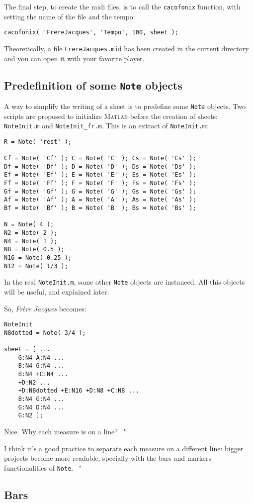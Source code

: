 \documentclass{article}
\newcommand\matlab{\textsc{Matlab}\xspace}
\newcommand\note{\lstinline!Note!\xspace}
\newcommand\frerejaques{\emph{Fr\`ere Jacques}\xspace}
\newcommand\noteInitFile{\texttt{NoteInit.m}\xspace}
\newcommand\noteInitFrFile{\texttt{NoteInit\_fr.m}\xspace}
\newenvironment{meenv}{ \par \noindent \makebox[6em][r]{ \textcolor{mecolor}{Me}: " --~}}{~"}
\newenvironment{myselfenv}{ \par \noindent \makebox[6em][r]{ \textcolor{myselfcolor}{Myself}: " --~}}{~"}
\newcommand{ \me }[1]{%
\begin{meenv}%
	#1%
\end{meenv} }
\newcommand{ \myself }[1]{%
\begin{myselfenv}%
	#1%
\end{myselfenv} }
\begin{document}
The final step, to create the midi files, is to call the \lstinline!cacofonix! function, with setting the name of the file and the tempo:
\begin{lstlisting}
cacofonix( 'FrereJacques', 'Tempo', 100, sheet );
\end{lstlisting}

Theoretically, a file \texttt{FrereJacques.mid} has been created in the current directory and you can open it with your favorite player.

\subsection{Predefinition of some \note objects}

A way to simplify the writing of a sheet is to predefine some \note objects. Two scripts are proposed to initialize \matlab before the creation of sheets: \noteInitFile and \noteInitFrFile. This is an extract of \noteInitFile:
\begin{lstlisting}
R = Note( 'rest' );

Cf = Note( 'Cf' ); C = Note( 'C' ); Cs = Note( 'Cs' );
Df = Note( 'Df' ); D = Note( 'D' ); Ds = Note( 'Ds' );
Ef = Note( 'Ef' ); E = Note( 'E' ); Es = Note( 'Es' );
Ff = Note( 'Ff' ); F = Note( 'F' ); Fs = Note( 'Fs' );
Gf = Note( 'Gf' ); G = Note( 'G' ); Gs = Note( 'Gs' );
Af = Note( 'Af' ); A = Note( 'A' ); As = Note( 'As' );
Bf = Note( 'Bf' ); B = Note( 'B' ); Bs = Note( 'Bs' );

N = Note( 4 );
N2 = Note( 2 );
N4 = Note( 1 );
N8 = Note( 0.5 );
N16 = Note( 0.25 );
N12 = Note( 1/3 );
\end{lstlisting}

In the real \noteInitFile, some other \note objects are instanced. All this objects will be useful, and explained later.

So, \frerejaques becomes:
\begin{lstlisting}
NoteInit
N8dotted = Note( 3/4 );

sheet = [ ...
	G:N4 A:N4 ...
	B:N4 G:N4 ...
	B:N4 +C:N4 ...
	+D:N2 ...
	+D:N8dotted +E:N16 +D:N8 +C:N8 ...
	B:N4 G:N4 ...
	G:N4 D:N4 ...
	G:N2 ];
\end{lstlisting}

\me{Nice. Why each measure is on a line?}
\myself{I think it's a good practice to separate each measure on a different line: bigger projects become more readable, specially with the bars and markers functionalities of \note.}

\subsection{Bars}
\end{document}
